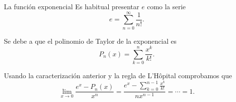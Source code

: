 \begin{frame}{La función exponencial}
  Es habitual presentar $e$ como la serie
  \[
    e = \sum_{n=0}^\infty \frac{1}{n!}.
  \]

  Se debe a que el polinomio de Taylor de la exponencial es
  \[
    P_n(x) = \sum_{k=0}^n \frac{x^k}{k!}.
  \]

  Usando la caracterización anterior y la regla de L'Hôpital comprobamos
  que
  \[
    \lim_{x \to 0} \frac{e^x - P_n(x)}{x^n}
    = \frac{e^x - \sum_{k = 0}^{n - 1} \frac{x^k}{k!}}{nx^{n - 1}}
    = \cdots = 1.
  \]
\end{frame}
